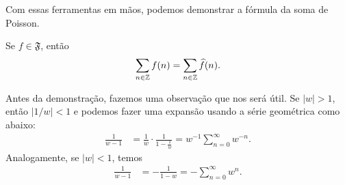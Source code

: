         Com essas ferramentas em mãos, podemos demonstrar a fórmula da soma de Poisson.
        \begin{teorema}
        \label{teo-form-soma-poisson}
            Se $f\in\mathfrak{F}$, então
            \begin{equation*}
                \sum_{n\in\mathbb{Z}} f(n) = \sum_{n\in\mathbb{Z}} \widehat{f}(n).
            \end{equation*}
        \end{teorema}
        Antes da demonstração, fazemos uma observação que nos será útil. Se $|w| > 1$, 
        então $|1/w| < 1$ e podemos fazer uma expansão usando a série geométrica como abaixo:
        \begin{align*}
            \frac{1}{w-1} &= \frac{1}{w}\cdot\frac{1}{1-\frac{1}{w}} 
            = w^{-1}\sum_{n = 0}^{\infty}w^{-n}.
        \end{align*}
        Analogamente, se $|w|<1$, temos
        \begin{align*}
            \frac{1}{w-1} &= -\frac{1}{1-w}
            = -\sum_{n = 0}^{\infty}w^{n}.
        \end{align*}
